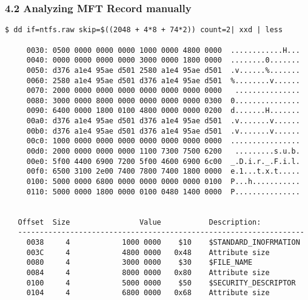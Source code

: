 \begin{frame}[fragile]
  \frametitle{4.2 Analyzing MFT Record manually}
  \begin{lstlisting}[basicstyle=\tiny]
$ dd if=ntfs.raw skip=$((2048 + 4*8 + 74*2)) count=2| xxd | less

     0030: 0500 0000 0000 0000 1000 0000 4800 0000  ............H...
     0040: 0000 0000 0000 0000 3000 0000 1800 0000  ........0.......
     0050: d376 a1e4 95ae d501 2580 a1e4 95ae d501  .v......%.......
     0060: 2580 a1e4 95ae d501 d376 a1e4 95ae d501  %........v......
     0070: 2000 0000 0000 0000 0000 0000 0000 0000   ...............
     0080: 3000 0000 8000 0000 0000 0000 0000 0300  0...............
     0090: 6400 0000 1800 0100 4800 0000 0000 0200  d.......H.......
     00a0: d376 a1e4 95ae d501 d376 a1e4 95ae d501  .v.......v......
     00b0: d376 a1e4 95ae d501 d376 a1e4 95ae d501  .v.......v......
     00c0: 1000 0000 0000 0000 0000 0000 0000 0000  ................
     00d0: 2000 0000 0000 0000 1100 7300 7500 6200   .........s.u.b.
     00e0: 5f00 4400 6900 7200 5f00 4600 6900 6c00  _.D.i.r._.F.i.l.
     00f0: 6500 3100 2e00 7400 7800 7400 1800 0000  e.1...t.x.t.....
     0100: 5000 0000 6800 0000 0000 0000 0000 0100  P...h...........
     0110: 5000 0000 1800 0000 0100 0480 1400 0000  P...............


   Offset  Size                Value           Description:
   ------------------------------------------------------------------
     0038     4            1000 0000    $10    $STANDARD_INOFRMATION
     003C     4            4800 0000   0x48    Attribute size
     0080     4            3000 0000    $30    $FILE_NAME
     0084     4            8000 0000   0x80    Attribute size
     0100     4            5000 0000    $50    $SECURITY_DESCRIPTOR
     0104     4            6800 0000   0x68    Attribute size
  \end{lstlisting}
\end{frame}


